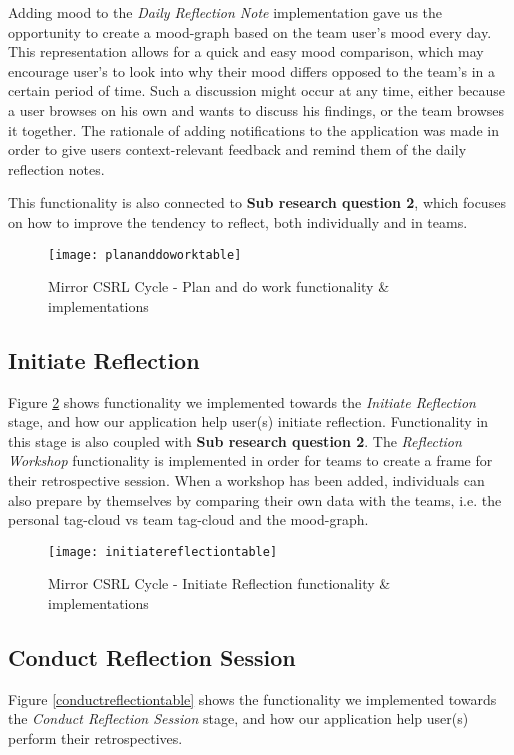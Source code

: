 Adding mood to the \emph{Daily Reflection Note} implementation gave us the opportunity to create a mood-graph based on the team user's mood every day. This representation allows for a quick and easy mood comparison, which may encourage user's to look into why their mood differs opposed to the team's in a certain period of time. Such a discussion might occur at any time, either because a user browses on his own and wants to discuss his findings, or the team browses it together.  
The rationale of adding notifications to the application was made in order to give users context-relevant feedback and remind them of the daily reflection notes. 

This functionality is also connected to \textbf{Sub research question 2}, which focuses on how to improve the tendency to reflect, both individually and in teams. 
\begin{figure}[H]
\centering
    \texttt{[image: plananddoworktable]}
\caption{Mirror CSRL Cycle - Plan and do work functionality \& implementations}
\label{plananddoworktable}
\end{figure}

\subsection{Initiate Reflection}
Figure \ref{initiatereflectiontable} shows functionality we implemented towards the \emph{Initiate Reflection} stage, and how our application help user(s) initiate reflection. Functionality in this stage is also coupled with \textbf{Sub research question 2}. The \emph{Reflection Workshop} functionality is implemented in order for teams to create a frame for their retrospective session. When a workshop has been added, individuals can also prepare by themselves by comparing their own data with the teams, i.e. the personal tag-cloud vs team tag-cloud and the mood-graph.  
\begin{figure}[H]
\centering
    \texttt{[image: initiatereflectiontable]}
\caption{Mirror CSRL Cycle - Initiate Reflection functionality \& implementations}
\label{initiatereflectiontable}
\end{figure}

\subsection{Conduct Reflection Session}
Figure \ref{conductreflectiontable} shows the functionality we implemented towards the \emph{Conduct Reflection Session} stage, and how our application help user(s) perform their retrospectives. 

